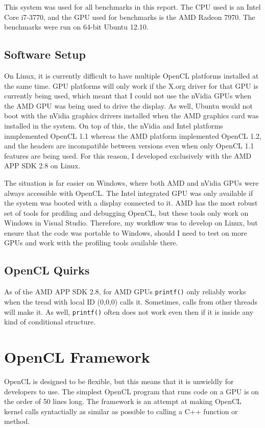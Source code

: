 \documentclass{article}
\begin{document}
This system was used for all benchmarks in this report. The CPU used is an Intel Core i7-3770, and the GPU used for benchmarks is the AMD Radeon 7970. The benchmarks were run on 64-bit Ubuntu 12.10.

\subsection{Software Setup}
On Linux, it is currently difficult to have multiple OpenCL platforms installed at the same time. GPU platforms will only work if the X.org driver for that GPU is currently being used, which meant that I could not use the nVidia GPUs when the AMD GPU was being used to drive the display. As well, Ubuntu would not boot with the nVidia graphics drivers installed when the AMD graphics card was installed in the system. On top of this, the nVidia and Intel platforms inmplemented OpenCL 1.1 whereas the AMD platform implemented OpenCL 1.2, and the headers are incompatible between versions even when only OpenCL 1.1 features are being used. For this reason, I developed exclusively with the AMD APP SDK 2.8 on Linux.

The situation is far easier on Windows, where both AMD and nVidia GPUs were always accessible with OpenCL. The Intel integrated GPU was only available if the system was booted with a display connected to it. AMD has the most robust set of tools for profiling and debugging OpenCL, but these tools only work on Windows in Visual Studio. Therefore, my workflow was to develop on Linux, but ensure that the code was portable to Windows, should I need to test on more GPUs and work with the profiling tools available there.

\subsection{OpenCL Quirks}
As of the AMD APP SDK 2.8, for AMD GPUs \texttt{printf()} only reliably works when the tread with local ID (0,0,0) calls it. Sometimes, calls from other threads will make it. As well, \texttt{printf()} often does not work even then if it is inside any kind of conditional structure.

\section{OpenCL Framework}
OpenCL is designed to be flexible, but this means that it is unwieldly for developers to use. The simplest OpenCL program that runs code on a GPU is on the order of 50 lines long. The framework is an attempt at making OpenCL kernel calls syntactially as similar as possible to calling a C++ function or method.
\end{document}
